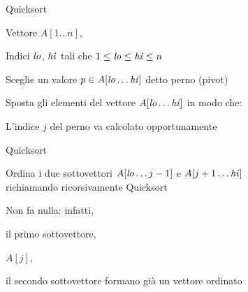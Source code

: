 \begin{frame}{Quicksort}

\vspace{-9pt}
\begin{myboxtitle}[Input]
\BI
\item Vettore $A[1 \ldots n]$, 
\item Indici $\mathit{lo}$, $\mathit{hi}$ tali che $1 \leq \mathit{lo} \leq \mathit{hi} \leq n$
\EI
\end{myboxtitle}

\begin{myboxtitle}[Divide]
\BIL
\item Sceglie un valore $p \in A[\mathit{lo} \ldots \mathit{hi}]$ 
  detto \alert{perno} (\alert{pivot})
\item Sposta gli elementi del vettore $A[\mathit{lo} \ldots \mathit{hi}]$ in modo che:



\item L'indice $j$ del perno va calcolato opportunamente
\EIL
\end{myboxtitle}

\end{frame}

\begin{frame}{Quicksort}

\vspace{-9pt}
\begin{myboxtitle}[Impera]
Ordina i due sottovettori $A[\mathit{lo} \ldots j  -  1]$ e $A[j + 1 \ldots \mathit{hi}]$\\ 
richiamando ricorsivamente Quicksort
\end{myboxtitle}

\begin{myboxtitle}[Combina]
Non fa nulla: infatti,
\BI
\item il primo sottovettore,
\item $A[j]$,
\item il secondo sottovettore 
\EI
formano già un vettore ordinato
\end{myboxtitle}

\end{frame}




